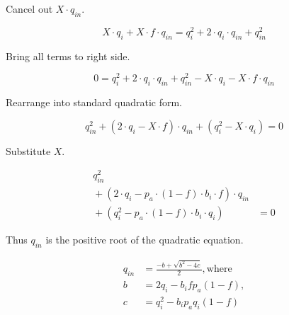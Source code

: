 \documentclass[table, twocolumn]{article}
\begin{document}
Cancel out $X \cdot q_{in}$.

\begin{equation}
  X \cdot q_i + X \cdot f \cdot q_{in} =
  q_i^2 + 2 \cdot q_i \cdot q_{in} + q_{in}^2 \nonumber
\end{equation}

Bring all terms to right side.

\begin{equation}
  0 = q_i^2 + 2 \cdot q_i \cdot q_{in} + q_{in}^2 - X \cdot q_i - X \cdot f \cdot q_{in}
  \nonumber
\end{equation}

Rearrange into standard quadratic form.

\begin{equation}
  q_{in}^2 + (2 \cdot q_i - X \cdot f) \cdot q_{in} + (q_i^2 - X \cdot q_i) = 0
  \nonumber
\end{equation}

Substitute $X$.

\begin{equation}
  \begin{aligned}
  q_{in}^2 & \\
  {}+ (2 \cdot q_i - p_a \cdot (1 - f) \cdot b_i \cdot f) \cdot q_{in} & \\
  {}+ (q_i^2 - p_a \cdot (1 - f) \cdot b_i \cdot q_i) &= 0
  \end{aligned} \nonumber
\end{equation}

Thus $q_{in}$ is the positive root of the quadratic equation.

\begin{equation}
  \begin{aligned}
    q_{in} &= \frac{-b + \sqrt{b^2 - 4c}}{2}, \text{where} \\
    b &= 2 q_i - b_i f p_a(1-f), \\
    c &= q_i^2 - b_i p_a q_i (1 - f)
    \end{aligned} \nonumber
\end{equation}
\end{document}
